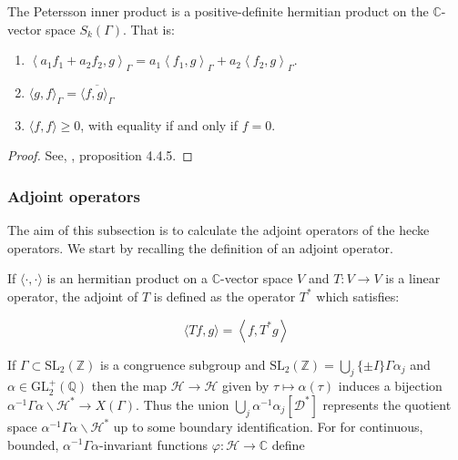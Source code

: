 \begin{proposition}
    The Petersson inner product is a positive-definite hermitian product on the $\mathbb{C}$-vector space $S_{k}(\Gamma)$. That is:

\begin{enumerate}
  \item $\left\langle a_{1} f_{1}+a_{2}f_{2}, g\right\rangle_{\Gamma}=a_{1}\left\langle f_{1}, g\right\rangle_{\Gamma}+a_{2}\left\langle f_{2}, g\right\rangle_{\Gamma}.$

  \item $\langle g, f\rangle_{\Gamma}=\overline{\langle f, g\rangle_{\Gamma}}$

  \item $\langle f, f\rangle \geq 0$, with equality if and only if $f=0$.

\end{enumerate}
\begin{proof}
    See, \cite{Masdeu2015ModularForms}, proposition 4.4.5.
\end{proof}
\end{proposition}

\subsubsection{Adjoint operators}

The aim of this subsection is to calculate the adjoint operators of the hecke operators. We start by recalling the definition of an adjoint operator.

\begin{definition}
    If $\langle\cdot, \cdot\rangle$ is an hermitian product on a $\mathbb{C}$-vector space $V$ and $T: V \rightarrow V$ is a linear operator, the adjoint of $T$ is defined as the operator $T^{*}$ which satisfies:

$$
\langle T f, g\rangle=\left\langle f, T^{*} g\right\rangle
$$

\end{definition}

If $\Gamma \subset \mathrm{SL}_{2}(\mathbb{Z})$ is a congruence subgroup and $\mathrm{SL}_{2}(\mathbb{Z})=\bigcup_{j}\{ \pm I\} \Gamma \alpha_{j}$ and $\alpha \in \mathrm{GL}_{2}^{+}(\mathbb{Q})$ then the map $\mathcal{H} \longrightarrow \mathcal{H}$ given by $\tau \mapsto \alpha(\tau)$ induces a bijection $\alpha^{-1} \Gamma \alpha \backslash \mathcal{H}^{*} \longrightarrow X(\Gamma)$. Thus the union $\bigcup_{j} \alpha^{-1} \alpha_{j}\left[\mathcal{D}^{*}\right]$ represents the quotient space $\alpha^{-1} \Gamma \alpha \backslash \mathcal{H}^{*}$ up to some boundary identification. For for continuous, bounded, $\alpha^{-1} \Gamma \alpha$-invariant functions $\varphi: \mathcal{H} \longrightarrow \mathbb{C}$ define

